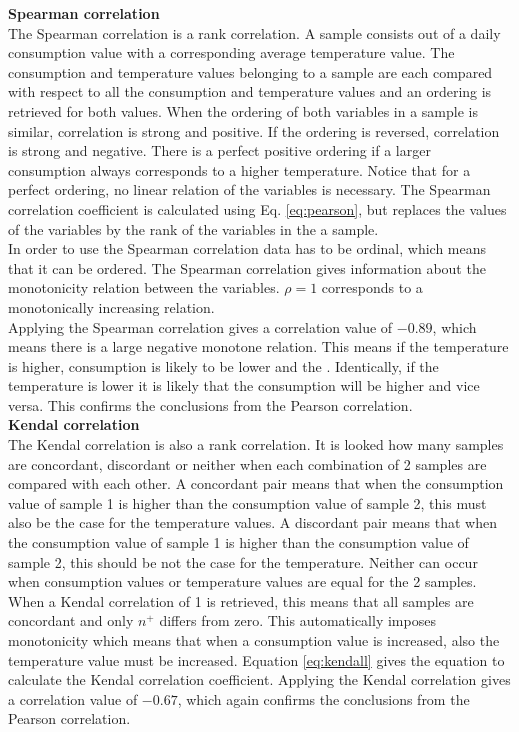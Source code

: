 \textbf{Spearman correlation}\\
The Spearman correlation is a rank correlation. A sample consists out of a daily consumption value with a corresponding average temperature value.
The consumption and temperature values belonging to a sample are each compared with respect to all the consumption and temperature values and an ordering is retrieved for both values. When the ordering of both variables in a sample is similar, correlation is strong and positive. If the ordering is reversed, correlation is strong and negative. There is a perfect positive ordering if a larger consumption always corresponds to a higher temperature. Notice that for a perfect ordering, no linear relation of the variables is necessary. The Spearman correlation coefficient is calculated using Eq. \ref{eq:pearson}, but replaces the values of the variables by the rank of the variables in the a sample.\\

In order to use the Spearman correlation data has to be ordinal, which means that it can be ordered. The Spearman correlation gives information about the monotonicity relation between the variables. $ \rho = 1 $ corresponds to a monotonically increasing relation.\\

Applying the Spearman correlation  gives a correlation value of $ -0.89$, which means there is a large negative monotone relation. This means if the temperature is higher, consumption is likely to be lower and the . Identically, if the temperature is lower it is likely that the consumption will be higher and vice versa. This confirms the conclusions from the Pearson correlation.\\

\textbf{Kendal correlation}\\
The Kendal correlation is also a rank correlation. It is looked how many samples are concordant, discordant or neither when each combination of 2 samples are compared with each other. A concordant pair means that when the consumption value of sample 1 is higher than the consumption value of sample 2, this must also be the case for the temperature values. A discordant pair means that when the consumption value of sample 1 is higher than the consumption value of sample 2, this should be not the case for the temperature. Neither can occur when consumption values or temperature values are equal for the 2 samples. When a Kendal correlation of 1 is retrieved, this means that all samples are concordant and only $ n^+ $ differs from zero. This automatically imposes monotonicity which means that when a consumption value is increased, also the temperature value must be increased. Equation \ref{eq:kendall} gives the equation to calculate the Kendal correlation coefficient. Applying the Kendal correlation  gives a correlation value of $ -0.67$, which again confirms the conclusions from the Pearson correlation.\\

